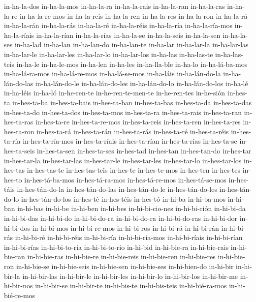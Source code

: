 {in-ha-la-dos
in-ha-la-mos
in-ha-la-ra
in-ha-la-rais
in-ha-la-ran
in-ha-la-ras
in-ha-la-re
in-ha-la-re-mos
in-ha-la-reis
in-ha-la-ren
in-ha-la-res
in-ha-la-ron
in-ha-la-rá
in-ha-la-rán
in-ha-la-rás
in-ha-la-ré
in-ha-la-réis
in-ha-la-ría
in-ha-la-ría-mos
in-ha-la-ríais
in-ha-la-rían
in-ha-la-rías
in-ha-la-se
in-ha-la-seis
in-ha-la-sen
in-ha-la-ses
in-ha-lad
in-ha-lan
in-ha-lan-do
in-ha-lan-te
in-ha-lar
in-ha-lar-la
in-ha-lar-las
in-ha-lar-le
in-ha-lar-les
in-ha-lar-lo
in-ha-lar-los
in-ha-las
in-ha-las-te
in-ha-las-teis
in-ha-le
in-ha-le-mos
in-ha-len
in-ha-les
in-ha-lla-ble
in-ha-lo
in-ha-lá-ba-mos
in-ha-lá-ra-mos
in-ha-lá-re-mos
in-ha-lá-se-mos
in-ha-láis
in-ha-lán-do-la
in-ha-lán-do-las
in-ha-lán-do-le
in-ha-lán-do-les
in-ha-lán-do-lo
in-ha-lán-do-los
in-ha-lé
in-ha-léis
in-ha-ló
in-he-ren-te
in-he-ren-te-men-te
in-he-ren-tes
in-he-sión
in-hes-ta
in-hes-ta-ba
in-hes-ta-bais
in-hes-ta-ban
in-hes-ta-bas
in-hes-ta-da
in-hes-ta-das
in-hes-ta-do
in-hes-ta-dos
in-hes-ta-mos
in-hes-ta-ra
in-hes-ta-rais
in-hes-ta-ran
in-hes-ta-ras
in-hes-ta-re
in-hes-ta-re-mos
in-hes-ta-reis
in-hes-ta-ren
in-hes-ta-res
in-hes-ta-ron
in-hes-ta-rá
in-hes-ta-rán
in-hes-ta-rás
in-hes-ta-ré
in-hes-ta-réis
in-hes-ta-ría
in-hes-ta-ría-mos
in-hes-ta-ríais
in-hes-ta-rían
in-hes-ta-rías
in-hes-ta-se
in-hes-ta-seis
in-hes-ta-sen
in-hes-ta-ses
in-hes-tad
in-hes-tan
in-hes-tan-do
in-hes-tar
in-hes-tar-la
in-hes-tar-las
in-hes-tar-le
in-hes-tar-les
in-hes-tar-lo
in-hes-tar-los
in-hes-tas
in-hes-tas-te
in-hes-tas-teis
in-hes-te
in-hes-te-mos
in-hes-ten
in-hes-tes
in-hes-to
in-hes-tá-ba-mos
in-hes-tá-ra-mos
in-hes-tá-re-mos
in-hes-tá-se-mos
in-hes-táis
in-hes-tán-do-la
in-hes-tán-do-las
in-hes-tán-do-le
in-hes-tán-do-les
in-hes-tán-do-lo
in-hes-tán-do-los
in-hes-té
in-hes-téis
in-hes-tó
in-hi-ba
in-hi-ba-mos
in-hi-ban
in-hi-bas
in-hi-be
in-hi-ben
in-hi-bes
in-hi-bi-cio-nes
in-hi-bi-ción
in-hi-bi-da
in-hi-bi-das
in-hi-bi-do
in-hi-bi-do-ra
in-hi-bi-do-ra
in-hi-bi-do-ras
in-hi-bi-dor
in-hi-bi-dos
in-hi-bi-mos
in-hi-bi-re-mos
in-hi-bi-ros
in-hi-bi-rá
in-hi-bi-rán
in-hi-bi-rás
in-hi-bi-ré
in-hi-bi-réis
in-hi-bi-ría
in-hi-bi-ría-mos
in-hi-bi-ríais
in-hi-bi-rían
in-hi-bi-rías
in-hi-bi-to-ria
in-hi-bi-to-rio
in-hi-bid
in-hi-bie-ra
in-hi-bie-rais
in-hi-bie-ran
in-hi-bie-ras
in-hi-bie-re
in-hi-bie-reis
in-hi-bie-ren
in-hi-bie-res
in-hi-bie-ron
in-hi-bie-se
in-hi-bie-seis
in-hi-bie-sen
in-hi-bie-ses
in-hi-bien-do
in-hi-bir
in-hi-bir-la
in-hi-bir-las
in-hi-bir-le
in-hi-bir-les
in-hi-bir-lo
in-hi-bir-los
in-hi-bir-me
in-hi-bir-nos
in-hi-bir-se
in-hi-bir-te
in-hi-bis-te
in-hi-bis-teis
in-hi-bié-ra-mos
in-hi-bié-re-mos
}
